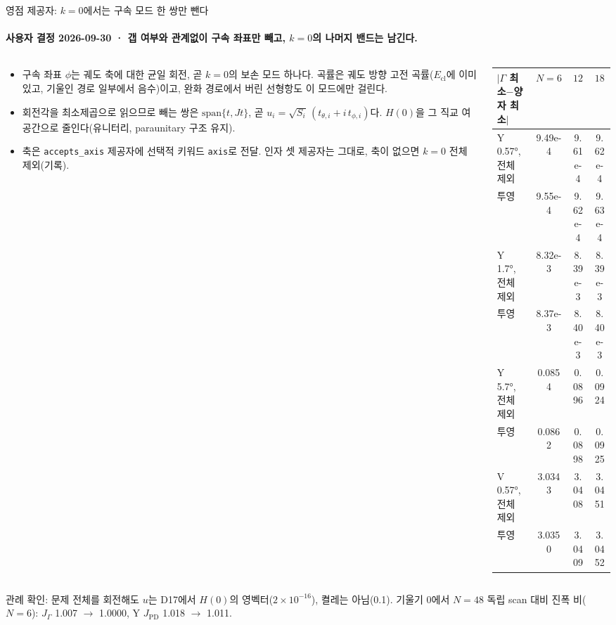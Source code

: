 \begin{frame}[label=d28-provider]{영점 제공자: $k=0$에서는 구속 모드 한 쌍만 뺀다}
  \framesubtitle{사용자 결정 2026-09-30 · 갭 여부와 관계없이 구속 좌표만 빼고, $k=0$의 나머지 밴드는 남긴다.}
  \footnotesize
  \begin{columns}[T,onlytextwidth]
    \begin{column}{0.46\textwidth}
      \begin{itemize}
        \item 구속 좌표 $\phi$는 궤도 축에 대한 균일 회전, 곧 $k=0$의 보손 모드 하나다. 곡률은 궤도 방향 고전 곡률($E_{\mathrm{cl}}$에 이미 있고, 기울인 경로 일부에서 음수)이고, 완화 경로에서 버린 선형항도 이 모드에만 걸린다.
        \item 회전각을 최소제곱으로 읽으므로 빼는 쌍은 $\mathrm{span}\{t, Jt\}$, 곧 $u_i=\sqrt{S_i}\,(t_{\theta,i}+i\,t_{\phi,i})$다. $H(0)$을 그 직교 여공간으로 줄인다(유니터리, paraunitary 구조 유지).
        \item 축은 \texttt{accepts\_axis} 제공자에 선택적 키워드 \texttt{axis}로 전달. 인자 셋 제공자는 그대로, 축이 없으면 $k=0$ 전체 제외(기록).
      \end{itemize}
    \end{column}
    \begin{column}{0.51\textwidth}
      \renewcommand{\arraystretch}{1.05}
      \begin{tabular}{@{}lccc@{}}
        \toprule
        $|\Gamma$ 최소$-$양자 최소$|$ & $N=6$ & $12$ & $18$ \\
        \midrule
        Y 0.57°, 전체 제외 & 9.49e-4 & 9.61e-4 & 9.62e-4 \\
        \phantom{Y 0.57°,} 투영 & 9.55e-4 & 9.62e-4 & 9.63e-4 \\
        Y 1.7°, 전체 제외 & 8.32e-3 & 8.39e-3 & 8.39e-3 \\
        \phantom{Y 1.7°,} 투영 & 8.37e-3 & 8.40e-3 & 8.40e-3 \\
        Y 5.7°, 전체 제외 & 0.0854 & 0.0896 & 0.0924 \\
        \phantom{Y 5.7°,} 투영 & 0.0862 & 0.0898 & 0.0925 \\
        V 0.57°, 전체 제외 & 3.0343 & 3.0408 & 3.0451 \\
        \phantom{V 0.57°,} 투영 & 3.0350 & 3.0409 & 3.0452 \\
        \bottomrule
      \end{tabular}
    \end{column}
  \end{columns}
  \par\medskip
  관례 확인: 문제 전체를 회전해도 $u$는 D17에서 $H(0)$의 영벡터($2\times10^{-16}$), 켤레는 아님(0.1). 기울기 0에서 $N=48$ 독립 scan 대비 진폭 비($N=6$): $J_\Gamma$ 1.007 $\to$ 1.0000, Y $J_{\mathrm{PD}}$ 1.018 $\to$ 1.011.
  \par\smallskip
\end{frame}


